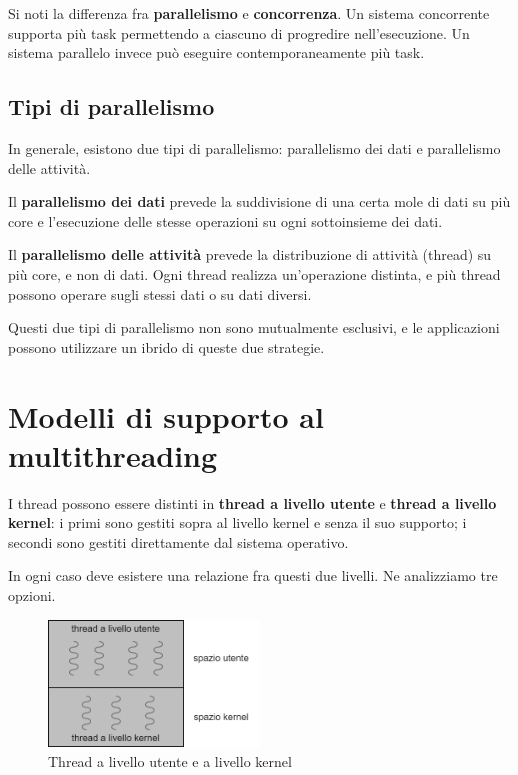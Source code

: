     Si noti la differenza fra \textbf{parallelismo} e \textbf{concorrenza}. Un sistema concorrente supporta più task permettendo a ciascuno di progredire nell'esecuzione. Un sistema parallelo invece può eseguire contemporaneamente più task.
    
    \subsection{Tipi di parallelismo}
        In generale, esistono due tipi di parallelismo: parallelismo dei dati e parallelismo delle attività.
        
        Il \textbf{parallelismo dei dati} prevede la suddivisione di una certa mole di dati su più core e l'esecuzione delle stesse operazioni su ogni sottoinsieme dei dati.
        
        Il \textbf{parallelismo delle attività} prevede la distribuzione di attività (thread) su più core, e non di dati. Ogni thread realizza un'operazione distinta, e più thread possono operare sugli stessi dati o su dati diversi.
        
        Questi due tipi di parallelismo non sono mutualmente esclusivi, e le applicazioni possono utilizzare un ibrido di queste due strategie.
        
    \section{Modelli di supporto al multithreading}
        I thread possono essere distinti in \textbf{thread a livello utente} e \textbf{thread a livello kernel}: i primi sono gestiti sopra al livello kernel e senza il suo supporto; i secondi sono gestiti direttamente dal sistema operativo.
        
        In ogni caso deve esistere una relazione fra questi due livelli. Ne analizziamo tre opzioni.
        \begin{figure}[h]
                \centering
                \includegraphics[width=0.5\textwidth]{img/thread1.png}
                \caption{Thread a livello utente e a livello kernel}
                \label{fig:thread1}
            \end{figure}
        
